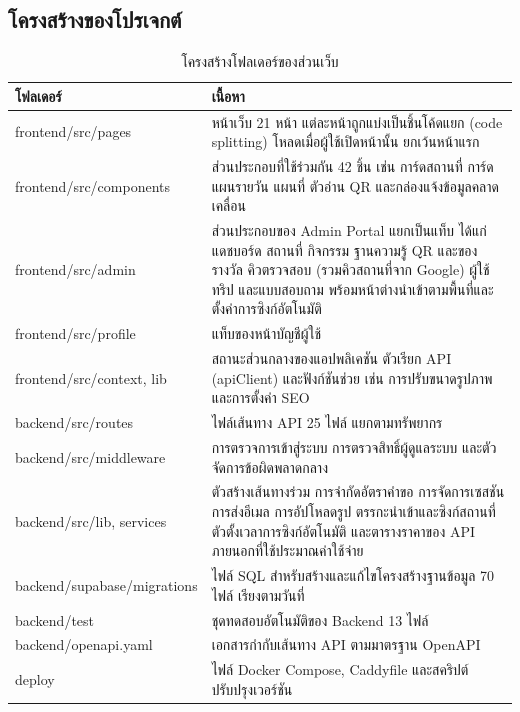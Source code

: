 \subsection{โครงสร้างของโปรเจกต์}


\begin{table}[H]
\centering
\caption{โครงสร้างโฟลเดอร์ของส่วนเว็บ}
\label{tab:folder_structure}
\begin{tabular}{|p{5.2cm}|p{7.4cm}|}
\hline
\textbf{โฟลเดอร์} & \textbf{เนื้อหา} \\
\hline
frontend/src/pages & หน้าเว็บ 21 หน้า แต่ละหน้าถูกแบ่งเป็นชิ้นโค้ดแยก (code splitting) โหลดเมื่อผู้ใช้เปิดหน้านั้น ยกเว้นหน้าแรก \\ \hline
frontend/src/components & ส่วนประกอบที่ใช้ร่วมกัน 42 ชิ้น เช่น การ์ดสถานที่ การ์ดแผนรายวัน แผนที่ ตัวอ่าน QR และกล่องแจ้งข้อมูลคลาดเคลื่อน \\ \hline
frontend/src/admin & ส่วนประกอบของ Admin Portal แยกเป็นแท็บ ได้แก่ แดชบอร์ด สถานที่ กิจกรรม ฐานความรู้ QR และของรางวัล คิวตรวจสอบ (รวมคิวสถานที่จาก Google) ผู้ใช้ ทริป และแบบสอบถาม พร้อมหน้าต่างนำเข้าตามพื้นที่และตั้งค่าการซิงก์อัตโนมัติ \\ \hline
frontend/src/profile & แท็บของหน้าบัญชีผู้ใช้ \\ \hline
frontend/src/context, lib & สถานะส่วนกลางของแอปพลิเคชัน ตัวเรียก API (\mbox{apiClient}) และฟังก์ชันช่วย เช่น การปรับขนาดรูปภาพและการตั้งค่า SEO \\ \hline
backend/src/routes & ไฟล์เส้นทาง API 25 ไฟล์ แยกตามทรัพยากร \\ \hline
backend/src/middleware & การตรวจการเข้าสู่ระบบ การตรวจสิทธิ์ผู้ดูแลระบบ และตัวจัดการข้อผิดพลาดกลาง \\ \hline
backend/src/lib, services & ตัวสร้างเส้นทางร่วม การจำกัดอัตราคำขอ การจัดการเซสชัน การส่งอีเมล การอัปโหลดรูป ตรรกะนำเข้าและซิงก์สถานที่ ตัวตั้งเวลาการซิงก์อัตโนมัติ และตารางราคาของ API ภายนอกที่ใช้ประมาณค่าใช้จ่าย \\ \hline
backend/supabase/migrations & ไฟล์ SQL สำหรับสร้างและแก้ไขโครงสร้างฐานข้อมูล 70 ไฟล์ เรียงตามวันที่ \\ \hline
backend/test & ชุดทดสอบอัตโนมัติของ Backend 13 ไฟล์ \\ \hline
backend/openapi.yaml & เอกสารกำกับเส้นทาง API ตามมาตรฐาน OpenAPI \\ \hline
deploy & ไฟล์ Docker Compose, Caddyfile และสคริปต์ปรับปรุงเวอร์ชัน \\
\hline
\end{tabular}
\end{table}

